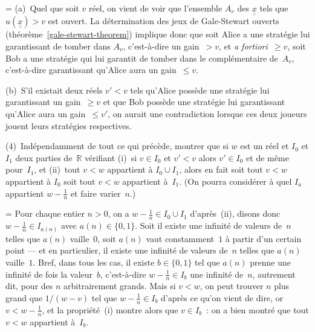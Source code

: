\documentclass[12pt,a4paper]{article}
\theoremstyle{definition}
\newcommand{\dblunderline}[1]{\underline{\underline{#1}}}
\newif\ifcorrige
\newenvironment{corrige}%
{\ifcorrige\relax\else\setbox0=\vbox\bgroup\fi%
\smallbreak\noindent{\underbar{\textit{Corrigé.}}\quad}}
{{\hbox{}\nobreak\hfill\checkmark}%
\ifcorrige\relax\else\egroup\fi\par}
\begin{document}
\begin{corrige}
(a) Quel que soit $v$ réel, on vient de voir que l'ensemble $A_v$ des
  $\dblunderline{x}$ tels que $u(\dblunderline{x}) > v$ est ouvert.  La
  détermination des jeux de Gale-Stewart ouverts
  (théorème \ref{gale-stewart-theorem}) implique donc que soit Alice a
  une stratégie lui garantissant de tomber dans $A_v$, c'est-à-dire un
  gain $>v$, et \textit{a fortiori $\geq v$}, soit Bob a une stratégie
  qui lui garantit de tomber dans le complémentaire de $A_v$,
  c'est-à-dire garantissant qu'Alice aura un gain $\leq v$.

(b) S'il existait deux réels $v' < v$ tels qu'Alice possède une
  stratégie lui garantissant un gain $\geq v$ et que Bob possède une
  stratégie lui garantissant qu'Alice aura un gain $\leq v'$, on
  aurait une contradiction lorsque ces deux joueurs jouent leurs
  stratégies respectives.
\end{corrige}

\smallbreak

(4) Indépendamment de tout ce qui précède, montrer que si $w$ est un
réel et $I_0$ et $I_1$ deux parties de $\mathbb{R}$ vérifiant (i) si
$v \in I_0$ et $v' < v$ alors $v' \in I_0$ et de même pour $I_1$, et
(ii) tout $v < w$ appartient à $I_0 \cup I_1$, alors en fait soit tout
$v<w$ appartient à $I_0$ soit tout $v<w$ appartient à $I_1$.  (On
pourra considérer à quel $I_a$ appartient $w - \frac{1}{n}$ et faire
varier $n$.)

\begin{corrige}
Pour chaque entier $n>0$, on a $w - \frac{1}{n} \in I_0 \cup I_1$
d'après (ii), disons donc $w - \frac{1}{n} \in I_{a(n)}$ avec $a(n)
\in \{0,1\}$.  Soit il existe une infinité de valeurs de $n$ telles
que $a(n)$ vaille $0$, soit $a(n)$ vaut constamment $1$ à partir d'un
certain point — et en particulier, il existe une infinité de valeurs
de $n$ telles que $a(n)$ vaille $1$.  Bref, dans tous les cas, il
existe $b \in \{0,1\}$ tel que $a(n)$ prenne une infinité de fois la
valeur $b$, c'est-à-dire $w - \frac{1}{n} \in I_b$ une infinité
de $n$, autrement dit, pour des $n$ arbitrairement grands.  Mais si
$v<w$, on peut trouver $n$ plus grand que $1/(w-v)$ tel que $w -
\frac{1}{n} \in I_b$ d'après ce qu'on vient de dire, or $v <
w-\frac{1}{n}$, et la propriété (i) montre alors que $v \in I_b$ : on
a bien montré que tout $v<w$ appartient à $I_b$.
\end{corrige}

\smallbreak
\end{document}
